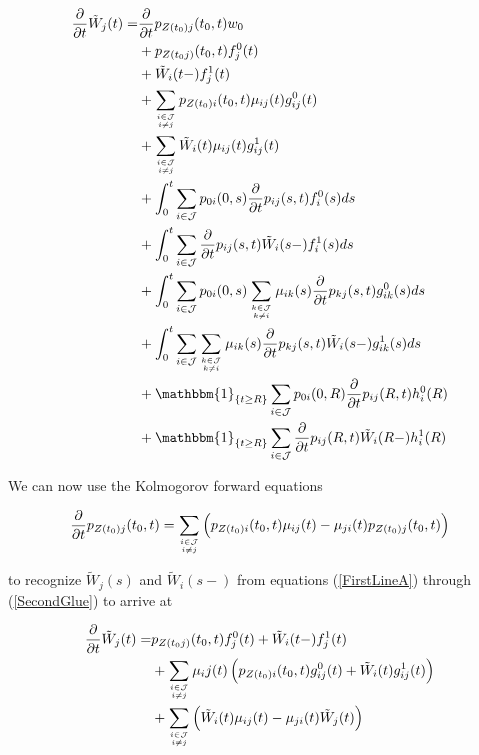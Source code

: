 \documentclass{article}
\newcommand{\1}[1]{\mathbbm{1}_{\left\lbrace #1 \right\rbrace}}
\theoremstyle{break}
\theoremstyle{remark}
\numberwithin{equation}{section}
\begin{document}
\begin{appendices}
\begin{align*}
\frac{\partial}{\partial t} \tilde{W}_j(t) =& \frac{\partial}{\partial t} p_{Z(t_0)j}(t_0,t) w_0 \\
&+ p_{Z(t_0j)}(t_0,t) f_j^0(t) \\
&+ \tilde{W}_i(t-) f_j^1(t) \\
&+ \sum_{i \in \mathcal{J} \atop i \neq j} p_{Z(t_0)i}(t_0,t) \mu_{ij}(t) g_{ij}^0(t) \\
&+ \sum_{i \in \mathcal{J} \atop i \neq j} \tilde{W}_i(t) \mu_{ij}(t) g_{ij}^1(t) \\
&+ \int_0^t \sum_{i \in \mathcal{J}} p_{0i}(0,s) \frac{\partial}{\partial t} p_{ij}(s,t) f_i^0(s) ds \\
&+ \int_0^t \sum_{i \in \mathcal{J}} \frac{\partial}{\partial t} p_{ij}(s,t) \tilde{W}_i(s-) f_i^1(s) ds \\
&+ \int_0^t \sum_{i \in \mathcal{J}} p_{0i}(0,s) \sum_{k \in \mathcal{J} \atop k \neq i} \mu_{ik}(s) \frac{\partial}{\partial t} p_{kj}(s,t) g_{ik}^0(s) ds \\
&+ \int_0^t \sum_{i \in \mathcal{J}} \sum_{k \in \mathcal{J} \atop k \neq i} \mu_{ik}(s) \frac{\partial}{\partial t} p_{kj}(s,t) \tilde{W}_i(s-) g_{ik}^1(s) ds \\
&+ \1{t \geq R}\sum_{i \in \mathcal{J}} p_{0i}(0,R) \frac{\partial}{\partial t} p_{ij}(R,t) h_i^0(R) \\
&+ \1{t \geq R}\sum_{i \in \mathcal{J}} \frac{\partial}{\partial t} p_{ij}(R,t) \tilde{W}_i(R-) h_i^1(R)
\end{align*}

We can now use the Kolmogorov forward equations

\begin{align*}
\frac{\partial}{\partial t} p_{Z(t_0)j}(t_0,t) = \sum_{i \in \mathcal{J} \atop i \neq j} \left( p_{Z(t_0)i}(t_0,t) \mu_{ij}(t) - \mu_{ji}(t) p_{Z(t_0)j}(t_0,t) \right)
\end{align*}

to recognize $\tilde{W}_j(s)$ and $\tilde{W}_i(s-)$ from equations (\ref{FirstLineA}) through (\ref{SecondGlue}) to arrive at

\begin{align*}
	\frac{\partial}{\partial t} \tilde{W}_j(t) =& p_{Z(t_0j)}(t_0,t) f_j^0(t) + \tilde{W}_i(t-) f_j^1(t) \\
	&+ \sum_{i \in \mathcal{J} \atop i \neq j} \mu_ij(t) \left( p_{Z(t_0)i}(t_0,t) g_{ij}^0(t) + \tilde{W}_i(t) g_{ij}^1(t) \right) \\
	&+ \sum_{i \in \mathcal{J} \atop i \neq j} \left( \tilde{W}_i(t) \mu_{ij}(t) - \mu_{ji}(t) \tilde{W}_j(t) \right)
\end{align*}


\end{appendices}
\end{document}
